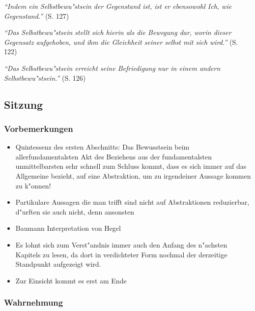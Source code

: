 \documentclass[emulatestandardclasses]{scrartcl}
\begin{document}
\emph{"`Indem ein Selbstbewu"stsein der Gegenstand ist, ist er ebensowohl Ich, wie Gegenstand."'} (S. 127)

\emph{"`Das Selbstbewu"stsein stellt sich hierin als die Bewegung dar, worin dieser Gegensatz aufgehoben, und ihm die Gleichheit seiner selbst mit sich wird."'} (S. 122)

\emph{"`Das Selbstbewu"stsein erreicht seine Befriedigung nur in einem andern Selbstbewu"stsein."'} (S. 126)

\subsection{Sitzung}

\subsubsection{Vorbemerkungen}

\begin{itemize}
  \item Quintessenz des ersten Abschnitts: Das Bewusstsein beim allerfundamentalsten Akt des Beziehens aus der fundamentalsten unmittelbarsten sehr schnell zum Schluss kommt, dass es sich immer auf das Allgemeine bezieht, auf eine Abstraktion, um zu irgendeiner Aussage kommen zu k"onnen!
  \item Partikulare Aussagen die man trifft sind nicht auf Abstraktionen reduzierbar, d"urften sie auch nicht, denn ansonsten 
  \item Baumann Interpretation von Hegel
  \item Es lohnt sich zum Verst"andnis immer auch den Anfang des n"achsten Kapitels zu lesen, da dort in verdichteter Form nochmal der derzeitige Standpunkt aufgezeigt wird. 
  \item Zur Einsicht kommt es erst am Ende
\end{itemize}

\subsubsection{Wahrnehmung}
\end{document}
